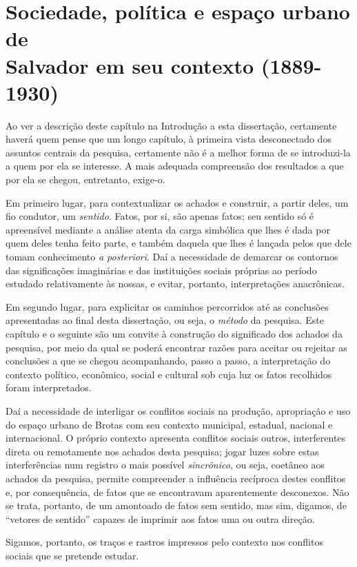 \chapter[Sociedade, política e espaço urbano de Salvador em seu contexto (1889-1930)]{Sociedade, política e espaço urbano de \\Salvador em seu contexto (1889-1930)}\label{cap:1}

Ao ver a descrição deste capítulo na Introdução a esta dissertação, certamente haverá quem pense que um longo capítulo, à primeira vista desconectado dos assuntos centrais da pesquisa, certamente não é a melhor forma de se introduzi-la a quem por ela se interesse. A mais adequada compreensão dos resultados a que por ela se chegou, entretanto, exige-o.

Em primeiro lugar, para contextualizar os achados e construir, a partir deles, um fio condutor, um \textit{sentido}. Fatos, por si, são apenas fatos; seu sentido só é apreensível mediante a análise atenta da carga simbólica que lhes é dada por quem deles tenha feito parte, e também daquela que lhes é lançada pelos que dele tomam conhecimento \textit{a posteriori}. Daí a necessidade de demarcar os contornos das significações imaginárias e das instituições sociais próprias ao período estudado relativamente às nossas, e evitar, portanto, interpretações anacrônicas.

Em segundo lugar, para explicitar os caminhos percorridos até as conclusões apresentadas ao final desta dissertação, ou seja, o \textit{método} da pesquisa. Este capítulo e o seguinte são um convite à construção do significado dos achados da pesquisa, por meio da qual se poderá encontrar razões para aceitar ou rejeitar as conclusões a que se chegou acompanhando, passo a passo, a interpretação do contexto político, econômico, social e cultural sob cuja luz os fatos recolhidos foram interpretados.

Daí a necessidade de interligar os conflitos sociais na produção, apropriação e uso do espaço urbano de Brotas com seu contexto municipal, estadual, nacional e internacional. O próprio contexto apresenta conflitos sociais outros, interferentes direta ou remotamente nos achados desta pesquisa; jogar luzes sobre estas interferências num registro o mais possível \textit{sincrônico}, ou seja, coetâneo aos achados da pesquisa, permite compreender a influência recíproca destes conflitos e, por consequência, de fatos que se encontravam aparentemente desconexos. Não se trata, portanto, de um amontoado de fatos sem sentido, mas sim, digamos, de ``vetores de sentido'' capazes de imprimir aos fatos uma ou outra direção.

Sigamos, portanto, os traços e rastros impressos pelo contexto nos conflitos sociais que se pretende estudar.






